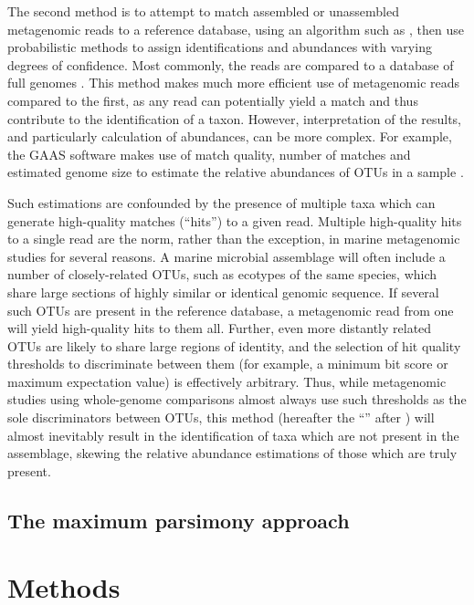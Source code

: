 The second method is to attempt to match assembled or unassembled metagenomic reads to a reference database, using an algorithm such as , then use probabilistic methods to assign identifications and abundances with varying degrees of confidence.
Most commonly, the reads are compared to a database of full genomes \citep[e.g.][]{Lauro:2010jna,Qin:2010fl}.
This method makes much more efficient use of metagenomic reads compared to the first, as any read can potentially yield a  match and thus contribute to the identification of a taxon.
However, interpretation of the results, and particularly calculation of abundances, can be more complex.
For example, the \ac{GAAS} software makes use of  match quality, number of matches and estimated genome size to estimate the relative abundances of \acp{OTU} in a sample \cite{Angly:2009ip}.

Such estimations are confounded by the presence of multiple taxa which can generate high-quality  matches (``hits'') to a given read.
Multiple high-quality hits to a single read are the norm, rather than the exception, in marine metagenomic studies for several reasons.
A marine microbial assemblage will often include a number of closely-related \acp{OTU}, such as ecotypes of the same species, which share large sections of highly similar or identical genomic sequence.
If several such \acp{OTU} are present in the reference database, a metagenomic read from one will yield high-quality  hits to them all.
Further, even more distantly related \acp{OTU} are likely to share large regions of identity, and the selection of hit quality thresholds to discriminate between them (for example, a minimum bit score or maximum expectation value) is effectively arbitrary.
Thus, while metagenomic studies using whole-genome comparisons almost always use such thresholds as the sole discriminators between \acp{OTU}, this method (hereafter the ``\naive'' after \citet{Ye:2009bl}) will almost inevitably result in the identification of taxa which are not present in the assemblage, skewing the relative abundance estimations of those which are truly present.

\subsection{The maximum parsimony approach}

\section{Methods}

